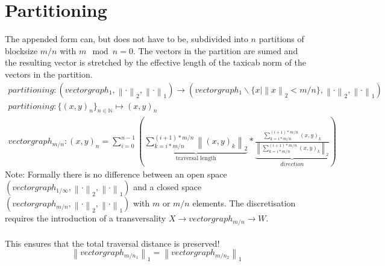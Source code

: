 \documentclass{report}
\newcommand\norm[1]{\left\lVert#1\right\rVert}
\begin{document}
\section{Partitioning}
The appended form can, but does not have to be, subdivided into $n$ partitions of blocksize $m/n$ with $m\mod n=0$. The vectors in the partition are sumed and the resulting vector is stretched by the effective length of the taxicab norm of the vectors in the partition.
\begin{align}
partitioning: (vectorgraph_{1},\norm{\cdot}_2,\norm{\cdot}_1) \rightarrow (vectorgraph_{1}\backslash\{x \vert \norm{x}_2 < m/n\},\norm{\cdot}_2,\norm{\cdot}_1)\\
partitioning: \{(x,y)_{n}\}_{n \in \mathbb{N}} \mapsto (x,y)_n\\
vectorgraph_{m/n}:(x,y)_{n}=\sum_{i=0}^{n-1} (\underbrace{\sum_{k=i*m/n}^{(i+1)*m/n} \norm{(x,y)_{k}}_2}_{\text{traversal length}} * \underbrace{\frac{\sum_{k=i*m/n}^{(i+1)*m/n} (x,y)_{k}}{\norm{ \sum_{k=i*m/n}^{(i+1)*m/n} (x,y)_{k} }_2}}_{direction})
\end{align}
Note: Formally there is no difference between an open space $(vectorgraph_{1/\infty},\norm{\cdot}_2,\norm{\cdot}_1)$ and a closed space $(vectorgraph_{m/n},\norm{\cdot}_2,\norm{\cdot}_1)$ with $m$ or $m/n$ elements. The discretisation requires the introduction of a transversality $X\rightarrow vectorgraph_{m/n} \rightarrow W$.\\\\
This ensures that the total traversal distance is preserved!
\begin{equation}
\norm{vectorgraph_{m/n_{1}}}_{1}=\norm{vectorgraph_{m/n_{2}}}_{1}\label{eq:9}
\end{equation}
\end{document}
